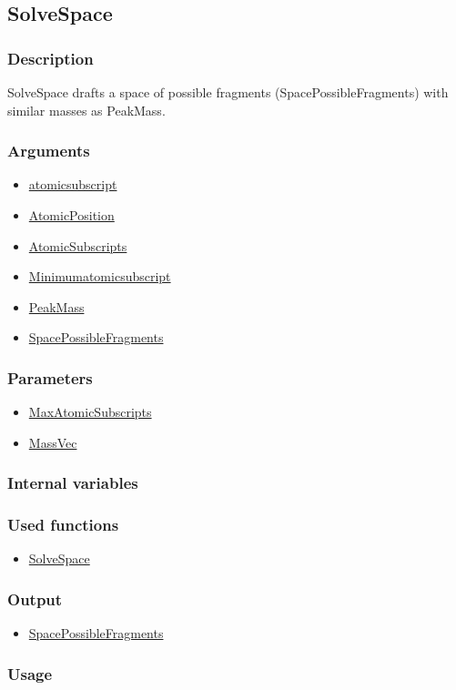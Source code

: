 \subsection{SolveSpace}\label{SolveSpace}
\subsubsection{Description}
SolveSpace drafts a space of possible fragments (SpacePossibleFragments) with similar masses as PeakMass.
\subsubsection{Arguments}
\begin{itemize}
\item \hyperref[atomicsubscript]{atomicsubscript}
\item \hyperref[AtomicPosition]{AtomicPosition}
\item \hyperref[AtomicSubscripts]{AtomicSubscripts}
\item \hyperref[Minimumatomicsubscript]{Minimumatomicsubscript}
\item \hyperref[PeakMass]{PeakMass}
\item \hyperref[SpacePossibleFragments]{SpacePossibleFragments}
\end{itemize}
\subsubsection{Parameters}
\begin{itemize}
\item \hyperref[MaxAtomicSubscripts]{MaxAtomicSubscripts}
\item \hyperref[MassVec]{MassVec}
\end{itemize}
\subsubsection{Internal variables}
\subsubsection{Used functions}
\begin{itemize}
\item \hyperref[SolveSpace]{SolveSpace}
\end{itemize}
\subsubsection{Output}
\begin{itemize}
\item \hyperref[SpacePossibleFragments]{SpacePossibleFragments}
\end{itemize}
\subsubsection{Usage}


